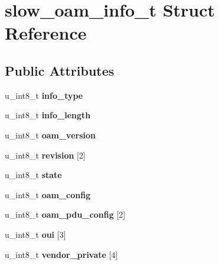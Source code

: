 \hypertarget{structslow__oam__info__t}{
\section{slow\_\-oam\_\-info\_\-t Struct Reference}
\label{structslow__oam__info__t}
}
\subsection*{Public Attributes}
\begin{DoxyCompactItemize}
\item 
\hypertarget{structslow__oam__info__t_a19478604da3f05665c2f8adefeb9f3d6}{
u\_\-int8\_\-t {\bfseries info\_\-type}}
\label{structslow__oam__info__t_a19478604da3f05665c2f8adefeb9f3d6}

\item 
\hypertarget{structslow__oam__info__t_a95508480b9f694e3e2a4406a5ca3ff7d}{
u\_\-int8\_\-t {\bfseries info\_\-length}}
\label{structslow__oam__info__t_a95508480b9f694e3e2a4406a5ca3ff7d}

\item 
\hypertarget{structslow__oam__info__t_a9be1e3770f209ba4aa7fa90b56394348}{
u\_\-int8\_\-t {\bfseries oam\_\-version}}
\label{structslow__oam__info__t_a9be1e3770f209ba4aa7fa90b56394348}

\item 
\hypertarget{structslow__oam__info__t_a1e5d3721d32c639c3ae76a90c1b5562b}{
u\_\-int8\_\-t {\bfseries revision} \mbox{[}2\mbox{]}}
\label{structslow__oam__info__t_a1e5d3721d32c639c3ae76a90c1b5562b}

\item 
\hypertarget{structslow__oam__info__t_ab94fc9ab4dc46043c53015b80080e14a}{
u\_\-int8\_\-t {\bfseries state}}
\label{structslow__oam__info__t_ab94fc9ab4dc46043c53015b80080e14a}

\item 
\hypertarget{structslow__oam__info__t_a7d56321eb513a370810c18c25a937bc9}{
u\_\-int8\_\-t {\bfseries oam\_\-config}}
\label{structslow__oam__info__t_a7d56321eb513a370810c18c25a937bc9}

\item 
\hypertarget{structslow__oam__info__t_aea5ed5a9b9e6778ed7ad72aa9b125aa3}{
u\_\-int8\_\-t {\bfseries oam\_\-pdu\_\-config} \mbox{[}2\mbox{]}}
\label{structslow__oam__info__t_aea5ed5a9b9e6778ed7ad72aa9b125aa3}

\item 
\hypertarget{structslow__oam__info__t_ac911ac03e655993a79af05e8385cfc0e}{
u\_\-int8\_\-t {\bfseries oui} \mbox{[}3\mbox{]}}
\label{structslow__oam__info__t_ac911ac03e655993a79af05e8385cfc0e}

\item 
\hypertarget{structslow__oam__info__t_a0ae46e779c1d76f6a400e39c7e443094}{
u\_\-int8\_\-t {\bfseries vendor\_\-private} \mbox{[}4\mbox{]}}
\label{structslow__oam__info__t_a0ae46e779c1d76f6a400e39c7e443094}

\end{DoxyCompactItemize}


